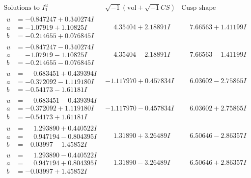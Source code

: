 \documentclass[1p]{elsarticle_modified}
\theoremstyle{definition}
\newcommand{\I}{\sqrt{-1}}
\begin{document}
$$\begin{array}{c|c|c}  
\text{Solutions to }I^u_{1}& \I (\text{vol} + \sqrt{-1}CS) & \text{Cusp shape}\\
 \hline 
\begin{aligned}
u &= -0.847247 + 0.340274 I \\
a &= -1.07919 + 1.10825 I \\
b &= -0.214655 + 0.076845 I\end{aligned}
 & \phantom{-}4.35404 + 2.18891 I & \phantom{-}7.66563 + 1.41199 I \\ \hline\begin{aligned}
u &= -0.847247 - 0.340274 I \\
a &= -1.07919 - 1.10825 I \\
b &= -0.214655 - 0.076845 I\end{aligned}
 & \phantom{-}4.35404 - 2.18891 I & \phantom{-}7.66563 - 1.41199 I \\ \hline\begin{aligned}
u &= \phantom{-}0.683451 + 0.439394 I \\
a &= -0.372092 - 1.119180 I \\
b &= -0.54173 - 1.61181 I\end{aligned}
 & -1.117970 + 0.457834 I & \phantom{-}6.03602 - 2.75865 I \\ \hline\begin{aligned}
u &= \phantom{-}0.683451 - 0.439394 I \\
a &= -0.372092 + 1.119180 I \\
b &= -0.54173 + 1.61181 I\end{aligned}
 & -1.117970 - 0.457834 I & \phantom{-}6.03602 + 2.75865 I \\ \hline\begin{aligned}
u &= \phantom{-}1.293890 + 0.440522 I \\
a &= \phantom{-}0.947194 - 0.804395 I \\
b &= -0.03997 - 1.45852 I\end{aligned}
 & \phantom{-}1.31890 + 3.26489 I & \phantom{-}6.50646 - 2.86357 I \\ \hline\begin{aligned}
u &= \phantom{-}1.293890 - 0.440522 I \\
a &= \phantom{-}0.947194 + 0.804395 I \\
b &= -0.03997 + 1.45852 I\end{aligned}
 & \phantom{-}1.31890 - 3.26489 I & \phantom{-}6.50646 + 2.86357 I \\ \hline\begin{aligned}

\end{aligned}
\end{array}$$
\end{document}
